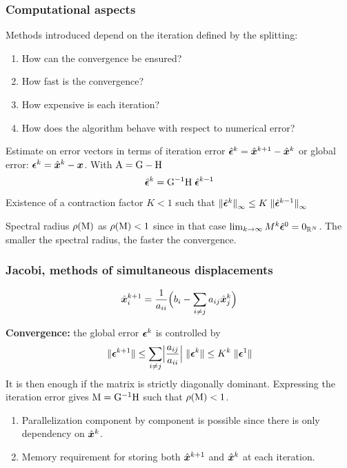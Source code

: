 \begin{frame}
  \frametitle{Computational aspects}

Methods introduced depend on the iteration defined by the splitting:
\begin{enumerate}
\item How can the convergence be ensured?
\item How fast is the convergence?
\item How expensive is each iteration?
\item How does the algorithm behave with respect to numerical error?
\end{enumerate}

\medskip
Estimate on error vectors in terms of iteration error $\hat{{\boldsymbol \epsilon}}^k = \hat{\boldsymbol x}^{k+1}-\hat{\boldsymbol x}^{k}$ or global error: ${\boldsymbol \epsilon}^k = \hat{\boldsymbol x}^{k}-{\boldsymbol x}$.
With ${\mathrm A} = {\mathrm G} - {\mathrm H}$
\[
\hat{{\boldsymbol \epsilon}}^{k} = {\mathrm G}^{-1}{\mathrm H}\;\hat{{\boldsymbol \epsilon}}^{k-1}
\]

\medskip
Existence of a contraction factor $K < 1$ such that ${\lVert \hat{{\boldsymbol \epsilon}}^{k} \rVert}_{\infty} \leq K\;{\lVert \hat{{\boldsymbol \epsilon}}^{k-1} \rVert}_{\infty}$

\medskip
Spectral radius $\rho({\mathrm M})$ as $\rho({\mathrm M}) < 1$ since in that case $\lim_{k\rightarrow\infty} M^k \hat{{\boldsymbol \epsilon}}^{0} = 0_{{\mathbb{R}^N}}$.
The smaller the spectral radius, the faster the convergence.

\end{frame}

\begin{frame}
  \frametitle{Jacobi, methods of simultaneous displacements}

\begin{equation}
\hat{\boldsymbol x}^{k+1}_i = \frac{1}{a_{ii}}\Bigl( b_i - \sum_{i\neq j} a_{ij} \hat{\boldsymbol x}^{k}_j \Bigr)
\end{equation}

\medskip
\textbf{Convergence:} the global error ${\boldsymbol \epsilon}^k$ is controlled by
\begin{equation*}
{\lVert {\boldsymbol \epsilon}^{k+1} \rVert} \leq \sum_{i\neq j} \Bigl\lvert\frac{a_{ij}}{a_{ii}}\Bigr\rvert\;{\lVert {\boldsymbol \epsilon}^{k} \rVert} \leq K^k \; {\lVert {\boldsymbol \epsilon}^{1} \rVert}
\end{equation*}
It is then enough if the matrix is strictly diagonally dominant.
Expressing the iteration error gives ${\mathrm M} = {\mathrm G}^{-1}{\mathrm H}$ such that $\rho({\mathrm M})< 1$.

\begin{enumerate}
\item Parallelization component by component is possible since there is only dependency on $\hat{\boldsymbol x}^{k}$.
\item Memory requirement for storing both $\hat{\boldsymbol x}^{k+1}$ and $\hat{\boldsymbol x}^{k}$ at each iteration.
\end{enumerate}

\end{frame}

